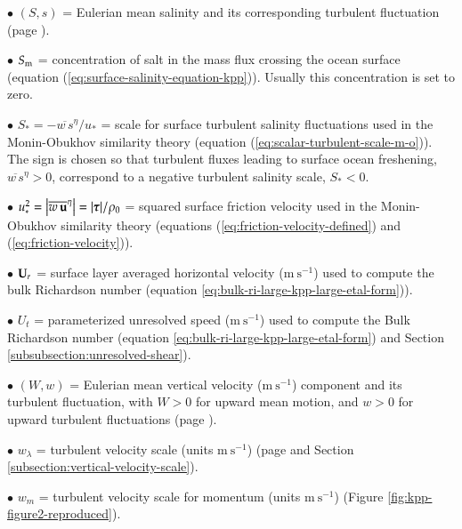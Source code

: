 \begin{mdframed}[backgroundcolor=lightgray!50]
\begin{trivlist}
\item[$\bullet$] $(S,s)$ = Eulerian mean salinity and its corresponding turbulent
  fluctuation (page \pageref{Lambda_defined}).

\item[$\bullet$] $S_{\mbox{\scriptsize m}}$ = concentration of salt in the mass flux
  crossing the ocean surface (equation
  (\ref{eq:surface-salinity-equation-kpp})).  Usually this
  concentration is set to zero.

\item[$\bullet$] $S_{*} = -\overline{w \, s}^{\eta} / u_{*}$ = scale
  for surface turbulent salinity fluctuations used in the
  Monin-Obukhov similarity theory (equation
  (\ref{eq:scalar-turbulent-scale-m-o})).  The sign is chosen so that
  turbulent fluxes leading to surface ocean freshening, $\overline{w
    \, s}^{\eta} > 0$, correspond to a negative turbulent salinity
  scale, $S_{*} < 0$.

\item[$\bullet$] $u_{*}^{2} = \left| \overline{w \, {\bf u}}^{\eta}
  \right| = | \mbox{\boldmath $\tau$} |/\rho_{0}$ = squared surface friction velocity
  used in the Monin-Obukhov similarity theory (equations
  (\ref{eq:friction-velocity-defined}) and
  (\ref{eq:friction-velocity})).

\item[$\bullet$] ${\bf U}_{r}$ = surface layer averaged horizontal
  velocity ($\mbox{m}~\mbox{s}^{-1}$) used to compute the bulk
  Richardson number (equation
  \ref{eq:bulk-ri-large-kpp-large-etal-form})).

\item[$\bullet$] $U_{t}$ = parameterized unresolved speed
  ($\mbox{m}~\mbox{s}^{-1}$) used to compute the Bulk Richardson
  number (equation \ref{eq:bulk-ri-large-kpp-large-etal-form}) and
  Section \ref{subsubsection:unresolved-shear}).

\item[$\bullet$] $(W,w)$ = Eulerian mean vertical velocity
  ($\mbox{m}~\mbox{s}^{-1}$) component and its turbulent fluctuation,
  with $W > 0$ for upward mean motion, and $w > 0$ for upward
  turbulent fluctuations (page \pageref{w_W_defined}).

\item[$\bullet$] $w_{\lambda}$ = turbulent velocity scale (units
  $\mbox{m}~\mbox{s}^{-1}$) (page 
  \pageref{subsubsection:turbulent-vertical-velocity-scale} and
  Section \ref{subsection:vertical-velocity-scale}).

\item[$\bullet$] $w_{m}$ = turbulent velocity scale for momentum
  (units $\mbox{m}~\mbox{s}^{-1}$) (Figure
  \ref{fig:kpp-figure2-reproduced}).


\end{trivlist}
\end{mdframed}
